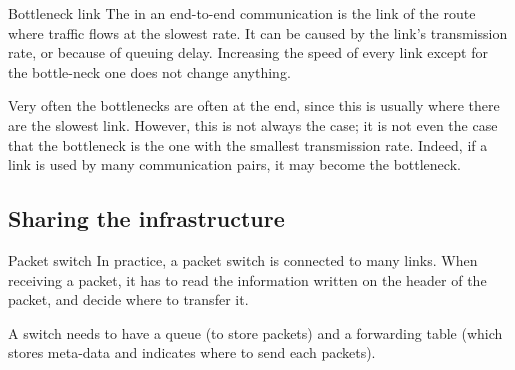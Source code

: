 \documentclass[a4paper]{article}
\begin{document}
\begin{parag}{Bottleneck link}
    The  in an end-to-end communication is the link of the route where traffic flows at the slowest rate. It can be caused by the link's transmission rate, or because of queuing delay. Increasing the speed of every link except for the bottle-neck one does not change anything.

    Very often the bottlenecks are often at the end, since this is usually where there are the slowest link. However, this is not always the case; it is not even the case that the bottleneck is the one with the smallest transmission rate. Indeed, if a link is used by many communication pairs, it may become the bottleneck.
\end{parag}

\subsection{Sharing the infrastructure}
\begin{parag}{Packet switch}
    In practice, a packet switch is connected to many links. When receiving a packet, it has to read the information written on the header of the packet, and decide where to transfer it.

    A switch needs to have a queue (to store packets) and a forwarding table (which stores meta-data and indicates where to send each packets).
\end{parag}
\end{document}
